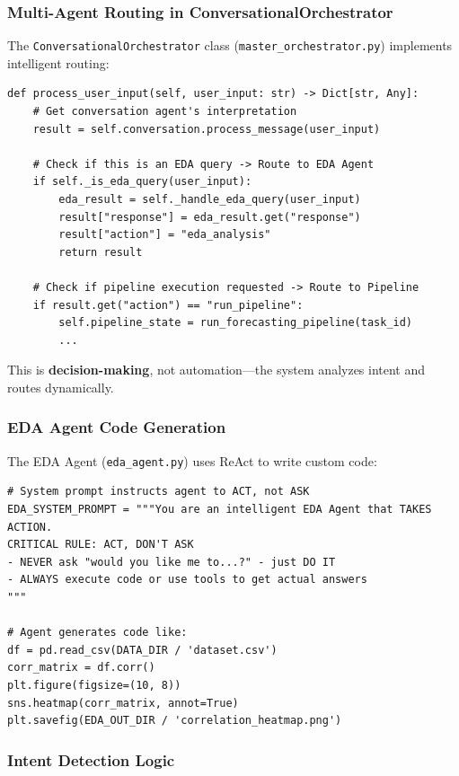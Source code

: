 \documentclass[11pt,a4paper]{article}
\begin{document}
\subsubsection{Multi-Agent Routing in ConversationalOrchestrator}

The \texttt{ConversationalOrchestrator} class (\texttt{master\_orchestrator.py}) implements intelligent routing:

\begin{verbatim}
def process_user_input(self, user_input: str) -> Dict[str, Any]:
    # Get conversation agent's interpretation
    result = self.conversation.process_message(user_input)

    # Check if this is an EDA query -> Route to EDA Agent
    if self._is_eda_query(user_input):
        eda_result = self._handle_eda_query(user_input)
        result["response"] = eda_result.get("response")
        result["action"] = "eda_analysis"
        return result

    # Check if pipeline execution requested -> Route to Pipeline
    if result.get("action") == "run_pipeline":
        self.pipeline_state = run_forecasting_pipeline(task_id)
        ...
\end{verbatim}

This is \textbf{decision-making}, not automation---the system analyzes intent and routes dynamically.

\subsubsection{EDA Agent Code Generation}

The EDA Agent (\texttt{eda\_agent.py}) uses ReAct to write custom code:

\begin{verbatim}
# System prompt instructs agent to ACT, not ASK
EDA_SYSTEM_PROMPT = """You are an intelligent EDA Agent that TAKES ACTION.
CRITICAL RULE: ACT, DON'T ASK
- NEVER ask "would you like me to...?" - just DO IT
- ALWAYS execute code or use tools to get actual answers
"""

# Agent generates code like:
df = pd.read_csv(DATA_DIR / 'dataset.csv')
corr_matrix = df.corr()
plt.figure(figsize=(10, 8))
sns.heatmap(corr_matrix, annot=True)
plt.savefig(EDA_OUT_DIR / 'correlation_heatmap.png')
\end{verbatim}

\subsubsection{Intent Detection Logic}
\end{document}
